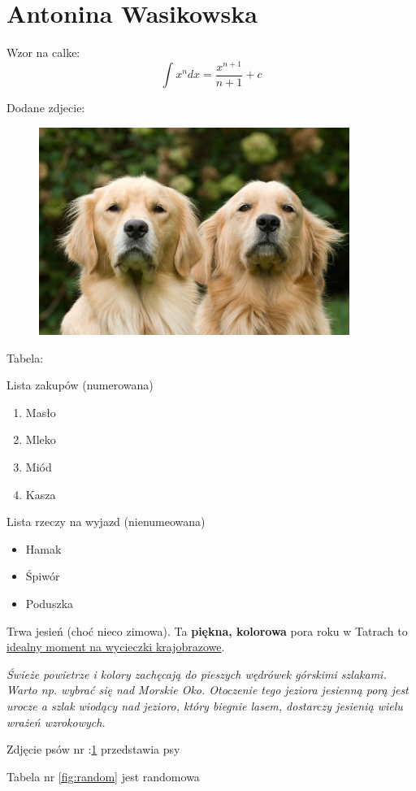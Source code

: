 \section{Antonina Wasikowska}

Wzor na calke:\[ \int x ^ n dx= \frac{x^{n+1}}{n+1} +c\]

\vspace{5cm}
Dodane zdjecie:
\begin{figure}[htbp]
    \centering
    \includegraphics[width=0.9\textwidth]{pictures/dogs.png} 
    \label{fig:dogs}
\end{figure}

\vspace{1cm}

Tabela:


\label{}

Lista zakupów (numerowana)

\begin{enumerate}
    \item Masło
    \item Mleko
    \item Miód
    \item Kasza
\end{enumerate}

\vspace{0.5cm}


Lista rzeczy na wyjazd (nienumeowana)
\begin{itemize}
    \item Hamak
    \item Śpiwór
    \item Poduszka
\end{itemize}

\begin{flushleft}
    Trwa jesień (choć nieco zimowa). Ta \textbf{piękna, kolorowa} pora roku w Tatrach to \underline{idealny moment na wycieczki krajobrazowe}.
\end{flushleft}
\begin{center}
    \textit{Świeże powietrze i kolory zachęcają do pieszych wędrówek górskimi szlakami. Warto np. wybrać się nad Morskie Oko. Otoczenie tego jeziora jesienną porą jest urocze a szlak wiodący nad jezioro, który biegnie lasem, dostarczy jesienią wielu wrażeń wzrokowych.}
\end{center}

\vspace{1cm}
Zdjęcie psów nr :\ref{fig:dogs} przedstawia psy\par
Tabela nr \ref{fig:random} jest randomowa







